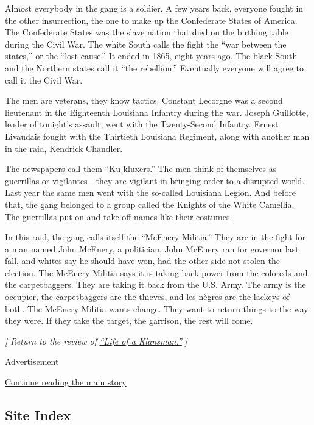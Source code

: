 Almost everybody in the gang is a soldier. A few years back, everyone
fought in the other insurrection, the one to make up the Confederate
States of America. The Confederate States was the slave nation that died
on the birthing table during the Civil War. The white South calls the
fight the ``war between the states,'' or the ``lost cause.'' It ended in
1865, eight years ago. The black South and the Northern states call it
``the rebellion.'' Eventually everyone will agree to call it the Civil
War.

The men are veterans, they know tactics. Constant Lecorgne was a second
lieutenant in the Eighteenth Louisiana Infantry during the war. Joseph
Guillotte, leader of tonight's assault, went with the Twenty-Second
Infantry. Ernest Livaudais fought with the Thirtieth Louisiana Regiment,
along with another man in the raid, Kendrick Chandler.

The newspapers call them ``Ku-kluxers.'' The men think of themselves as
guerrillas or vigilantes---they are vigilant in bringing order to a
disrupted world. Last year the same men went with the so-called
Louisiana Legion. And before that, the gang belonged to a group called
the Knights of the White Camellia. The guerrillas put on and take off
names like their costumes.

In this raid, the gang calls itself the ``McEnery Militia.'' They are in
the fight for a man named John McEnery, a politician. John McEnery ran
for governor last fall, and whites say he should have won, had the other
side not stolen the election. The McEnery Militia says it is taking back
power from the coloreds and the carpetbaggers. They are taking it back
from the U.S. Army. The army is the occupier, the carpetbaggers are the
thieves, and les nègres are the lackeys of both. The McEnery Militia
wants change. They want to return things to the way they were. If they
take the target, the garrison, the rest will come.

\emph{{[} Return to the review of}
\href{https://www.nytimes3xbfgragh.onion/2020/08/04/books/review/life-of-a-klansman-edward-ball.html}{\emph{``Life
of a Klansman.''}} \emph{{]}}

Advertisement

\protect\hyperlink{after-bottom}{Continue reading the main story}

\hypertarget{site-index}{%
\subsection{Site Index}\label{site-index}}

